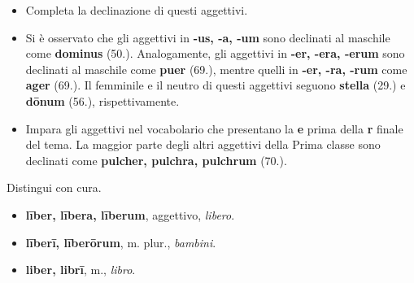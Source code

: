 \documentclass[nols]{tufte-handout}
\newcommand{\textls}[2][5]{%
    \begingroup\addfontfeatures{LetterSpace=#1}#2\endgroup
  }
\renewcommand{\smallcapsspacing}[1]{\textls[10]{#1}}
\renewcommand{\textsc}[1]{\smallcapsspacing{\textsmallcaps{#1}}}
\begin{document}
\begin{itemize}
\item[\textsc{1.}] Completa la declinazione di questi aggettivi.
\item[\textsc{2.}] Si è osservato che gli aggettivi in \textbf{-us, -a, -um} sono declinati al maschile come \textbf{dominus} (50.). 
Analogamente, gli aggettivi in \textbf{-er, -era, -erum} sono declinati al maschile come \textbf{puer} (69.), 
mentre quelli in \textbf{-er, -ra, -rum} come \textbf{ager} (69.). Il femminile e il neutro di questi aggettivi seguono \textbf{stella} (29.) e \textbf{dōnum} (56.), rispettivamente.  
\item[\textsc{3.}] Impara gli aggettivi nel vocabolario che presentano la \textbf{e} prima della \textbf{r} finale del tema. La maggior parte degli altri aggettivi
della Prima classe sono declinati come \textbf{pulcher, pulchra, pulchrum} (70.).
\end{itemize}

 Distingui con cura.
\begin{itemize}
\item \textbf{līber, lībera, līberum}, aggettivo, \textit{libero}.  
\item \textbf{līberī, līberōrum}, m. plur., \textit{bambini}. 
\item \textbf{liber, librī}, m., \textit{libro}.   
\end{itemize}

\end{document}
